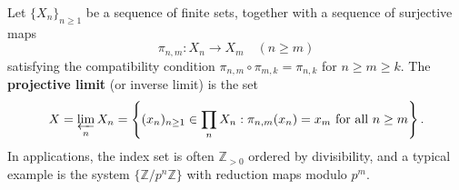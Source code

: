Let $\{X_n\}_{n \geq 1}$ be a sequence of finite sets, together with a sequence of surjective maps
$$\pi_{n,m} : X_n \to X_m \quad (n \geq m)$$
satisfying the compatibility condition $\pi_{n,m} \circ \pi_{m,k} = \pi_{n,k}$ for $n \geq m \geq k$. The \textbf{projective limit} (or inverse limit) is the set
$$X = \varprojlim_{n} X_n = \left\{ (x_n)_{n \geq 1} \in \prod_{n} X_n : \pi_{n,m}(x_n) = x_m \text{ for all } n \geq m \right\}.$$
In applications, the index set is often $\mathbb{Z}_{>0}$ ordered by divisibility, and a typical example is the system $\{\mathbb{Z}/p^n\mathbb{Z}\}$ with reduction maps modulo $p^m$.
